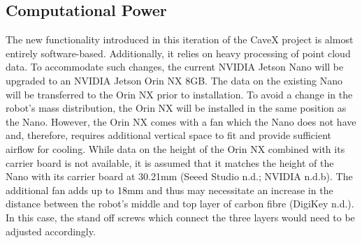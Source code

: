 \subsection{Computational Power}
The new functionality introduced in this iteration of the CaveX project is almost entirely software-based. Additionally, it relies on heavy processing of point cloud data. To accommodate such changes, the current NVIDIA Jetson Nano will be upgraded to an NVIDIA Jetson Orin NX 8GB. The data on the existing Nano will be transferred to the Orin NX prior to installation. To avoid a change in the robot's mass distribution, the Orin NX will be installed in the same position as the Nano. However, the Orin NX comes with a fan which the Nano does not have and, therefore, requires additional vertical space to fit and provide sufficient airflow for cooling. While data on the height of the Orin NX combined with its carrier board is not available, it is assumed that it matches the height of the Nano with its carrier board at 30.21mm (Seeed Studio n.d.; NVIDIA n.d.b). The additional fan adds up to 18mm and thus may necessitate an increase in the distance between the robot's middle and top layer of carbon fibre (DigiKey n.d.). In this case, the stand off screws which connect the three layers would need to be adjusted accordingly. 

